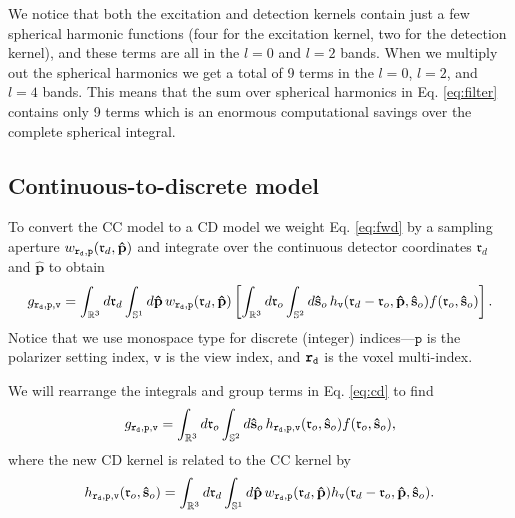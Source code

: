 \documentclass[11pt]{article}
\providecommand{\ro}{\mathbf{\mathfrak{r}}_o}
\providecommand{\so}{\mathbf{\hat{s}}_o}
\providecommand{\rd}{\mathbf{\mathfrak{r}}_d}
\providecommand{\mh}[1]{\mathbf{\hat{#1}}}
\providecommand{\mbb}[1]{\mathbb{#1}}
\providecommand{\tv}{\texttt{v}}
\providecommand{\tb}[1]{\textbf{#1}}
\providecommand{\ttt}[1]{\texttt{#1}}
\providecommand{\p}{\mh{p}}
\providecommand{\intr}[1]{\int_{\mbb{R}^{#1}}}
\providecommand{\ints}[1]{\int_{\mbb{S}^{#1}}}
\begin{document}
We notice that both the excitation and detection kernels contain just a few
spherical harmonic functions (four for the excitation kernel, two for the
detection kernel), and these terms are all in the $l=0$ and $l=2$ bands. When we
multiply out the spherical harmonics we get a total of 9 terms in the $l=0$,
$l=2$, and $l=4$ bands. This means that the sum over spherical harmonics in Eq.
\ref{eq:filter} contains only 9 terms which is an enormous computational savings
over the complete spherical integral.

\subsection{Continuous-to-discrete model}
To convert the CC model to a CD model we weight Eq. \ref{eq:fwd} by a sampling
aperture $w_{\tb{\ttt{r}}_{\ttt{d}}, \ttt{p}}(\rd, \p)$ and integrate over the
continuous detector coordinates $\rd$ and $\p$ to obtain
\begin{align}
  g_{\tb{\ttt{r}}_{\ttt{d}},\ttt{p},\ttt{v}} = \intr{3}d\rd\ints{1}d\p\, w_{\tb{\ttt{r}}_{\ttt{d}}, \ttt{p}}(\rd, \p)\left[\intr{3}d\ro \ints{2}d\so\, h_{\tv}(\rd - \ro, \p, \so)f(\ro, \so)\right]. \label{eq:cd}
\end{align}
Notice that we use monospace type for discrete (integer) indices---$\ttt{p}$ is the
polarizer setting index, $\ttt{v}$ is the view index, and
$\tb{\ttt{r}}_{\ttt{d}}$ is the voxel multi-index.

We will rearrange the integrals and group terms in Eq. \ref{eq:cd} to find 
\begin{align}
  g_{\tb{\ttt{r}}_{\ttt{d}},\ttt{p},\ttt{v}} = \intr{3}d\ro \ints{2}d\so\, h_{\tb{\ttt{r}}_{\ttt{d}}, \ttt{p}, \ttt{v}}(\ro, \so) f(\ro, \so), \label{eq:cd2}
\end{align}
where the new CD kernel is related to the CC kernel by
\begin{align}
   h_{\tb{\ttt{r}}_{\ttt{d}}, \ttt{p}, \ttt{v}}(\ro,\so) = \intr{3}d\rd\ints{1}d\p\, w_{\tb{\ttt{r}}_{\ttt{d}}, \ttt{p}}(\rd, \p) h_{\tv}(\rd - \ro, \p, \so).
\end{align}
\end{document}
